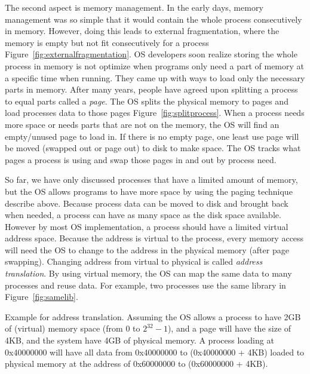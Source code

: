 The second aspect is memory management. In the early days, memory management was so simple that it would contain the whole process consecutively in memory. However, doing this leads to external fragmentation, where the memory is empty but not fit consecutively for a process Figure~\ref{fig:externalfragmentation}. OS developers soon realize storing the whole process in memory is not optimize when programs only need a part of memory at a specific time when running. They came up with ways to load only the necessary parts in memory. After many years, people have agreed upon splitting a process to equal parts called a \textit{page}. The OS splits the physical memory to pages and load processes data to those pages Figure~\ref{fig:splitprocess}. When a process needs more space or needs parts that are not on the memory, the OS will find an empty/unused page to load in. If there is no empty page, one least use page will be moved (swapped out or page out) to disk to make space. The OS tracks what pages a process is using and swap those pages in and out by process need.

So far, we have only discussed processes that have a limited amount of memory, but the OS allows programs to have more space by using the paging technique describe above. Because process data can be moved to disk and brought back when needed, a process can have as many space as the disk space available. However by most OS implementation, a process should have a limited virtual address space. Because the address is virtual to the process, every memory access will need the OS to change to the address in the physical memory (after page swapping). Changing address from virtual to physical is called \textit{address translation}. By using virtual memory, the OS can map the same data to many processes and reuse data. For example, two processes use the same library in Figure~\ref{fig:samelib}.

Example for address translation. Assuming the OS allows a process to have 2GB of (virtual) memory space (from 0 to $2^{32}-1$), and a page will have the size of 4KB, and the system have 4GB of physical memory. A process loading at 0x40000000 will have all data from 0x40000000 to (0x40000000 + 4KB) loaded to physical memory at the address of 0x60000000 to (0x60000000 + 4KB).

